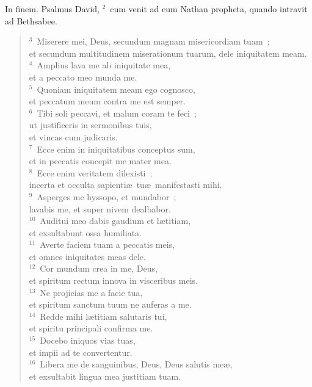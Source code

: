 \lettrine[lines=3,image=true,loversize=0.05,lraise=-0.03]{I}{}n finem. Psalmus David,
${}^{2}$~cum venit ad eum Nathan propheta, quando intravit ad Bethsabee.
\begin{flushleft}\begin{verse}${}^{3}$~Miserere mei, Deus, secundum magnam misericordiam tuam~;\\ et secundum multitudinem miserationum tuarum, dele iniquitatem meam.\\
${}^{4}$~Amplius lava me ab iniquitate mea,\\ et a peccato meo munda me.\\
${}^{5}$~Quoniam iniquitatem meam ego cognosco,\\ et peccatum meum contra me est semper.\\
${}^{6}$~Tibi soli peccavi, et malum coram te feci~;\\ ut justificeris in sermonibus tuis,\\ et vincas cum judicaris.\\
${}^{7}$~Ecce enim in iniquitatibus conceptus sum,\\ et in peccatis concepit me mater mea.\\
${}^{8}$~Ecce enim veritatem dilexisti~;\\ incerta et occulta sapienti\ae\ tu\ae\ manifestasti mihi.\\
${}^{9}$~Asperges me hyssopo, et mundabor~;\\ lavabis me, et super nivem dealbabor.\\
${}^{10}$~Auditui meo dabis gaudium et l\ae titiam,\\ et exsultabunt ossa humiliata.\\
${}^{11}$~Averte faciem tuam a peccatis meis,\\ et omnes iniquitates meas dele.\\
${}^{12}$~Cor mundum crea in me, Deus,\\ et spiritum rectum innova in visceribus meis.\\
${}^{13}$~Ne projicias me a facie tua,\\ et spiritum sanctum tuum ne auferas a me.\\
${}^{14}$~Redde mihi l\ae titiam salutaris tui,\\ et spiritu principali confirma me.\\
${}^{15}$~Docebo iniquos vias tuas,\\ et impii ad te convertentur.\\
${}^{16}$~Libera me de sanguinibus, Deus, Deus salutis me\ae ,\\ et exsultabit lingua mea justitiam tuam.\\

\end{verse}
\end{flushleft}
